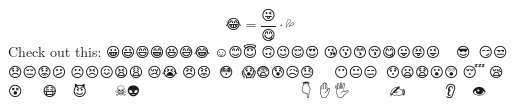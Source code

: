 \documentclass[a5paper,11pt]{article}
\begin{document}
\begin{equation*}
	😂 = \dfrac{😜}{😋} \cdot 💦
\end{equation*}
Check out this: 😀😃😄😁😆😅😂🤣☺😊😇🙂🙃😉😌😍🥰😘😗😙😚😋😛😝😜🤪🤨🧐🤓😎🤩🥳😏😒😞😔😟😕🙁☹😣😖😫😩🥺😢😭😤😠😡🤬🤯😳🥵🥶😱😨😰😥😓🤗🤔🤭🤫🤥😶😐😑😬🙄😯😦😧😮😲🥱😴🤤😪😵🤐🥴🤢🤮🤧😷🤒🤕🤑🤠😈👿👹👺🤡💩👻💀☠👽👾🤖🎃😺😸😹😻😼😽🙀😿😾🤲👐🙌👏🏼🤝👍🏼👎🏼👊✊🏼🤛🤜🤞✌🏼🤟🤘👌🏼🤏👈🏼👉🏼👆🏼👇☝🏼✋🤚🖐🖖👋🏼🤙🏼💪🏼🦾🖕🏽✍🙏🏼🦶🦵🦿💄💋👄🦷👅👂🦻👃🏼👣👁👀🧠
\end{document}
